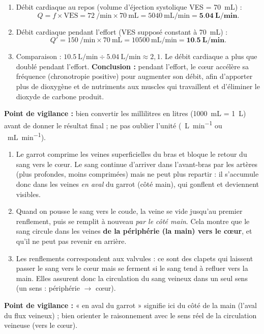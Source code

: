 \documentclass[11pt]{article}
\newcommand{\cle}[1]{{\popxbold\color{popdark}#1}}
\begin{document}
\begin{corrige}
\begin{enumerate}
\item Débit cardiaque au repos (volume d'éjection systolique \cle{VES} = \SI{70}{\milli\liter}) :
\[ Q = f \times \text{VES} = \SI{72}{\per\minute} \times \SI{70}{\milli\liter} = \SI{5040}{\milli\liter\per\minute} = \mathbf{\SI{5,04}{\liter\per\minute}}. \]
\item Débit cardiaque pendant l'effort (VES supposé constant à \SI{70}{\milli\liter}) :
\[ Q' = \SI{150}{\per\minute} \times \SI{70}{\milli\liter} = \SI{10500}{\milli\liter\per\minute} = \mathbf{\SI{10,5}{\liter\per\minute}}. \]
\item Comparaison : $\SI{10,5}{\liter\per\minute} \div \SI{5,04}{\liter\per\minute} \approx 2,1$. Le débit cardiaque a plus que doublé pendant l'effort. \textbf{Conclusion :} pendant l'effort, le cœur accélère sa fréquence (chronotropie positive) pour augmenter son débit, afin d'apporter plus de dioxygène et de nutriments aux muscles qui travaillent et d'éliminer le dioxyde de carbone produit.
\end{enumerate}
\textbf{Point de vigilance :} bien convertir les millilitres en litres (\SI{1000}{\milli\liter} = \SI{1}{\liter}) avant de donner le résultat final ; ne pas oublier l'unité (\SI{}{\liter\per\minute} ou \SI{}{\milli\liter\per\minute}).
\end{corrige}

\begin{corrige}
\begin{enumerate}
\item Le garrot comprime les veines superficielles du bras et bloque le retour du sang vers le cœur. Le sang continue d'arriver dans l'avant-bras par les artères (plus profondes, moins comprimées) mais ne peut plus repartir : il s'accumule donc dans les veines \emph{en aval} du garrot (côté main), qui gonflent et deviennent visibles.
\item Quand on pousse le sang vers le coude, la veine se vide jusqu'au premier renflement, puis se remplit à nouveau \emph{par le côté main}. Cela montre que le sang circule dans les veines \textbf{de la périphérie (la main) vers le cœur}, et qu'il ne peut pas revenir en arrière.
\item Les renflements correspondent aux \cle{valvules} : ce sont des clapets qui laissent passer le sang vers le cœur mais se ferment si le sang tend à refluer vers la main. Elles assurent donc la circulation du sang veineux dans un seul sens (un sens : périphérie $\to$ cœur).
\end{enumerate}
\textbf{Point de vigilance :} « en aval du garrot » signifie ici du côté de la main (l'aval du flux veineux) ; bien orienter le raisonnement avec le sens réel de la circulation veineuse (vers le cœur).
\end{corrige}
\end{document}
